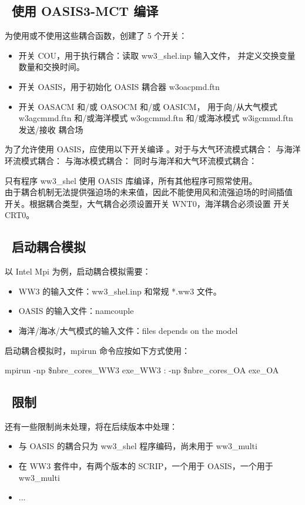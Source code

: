 \vssub
\subsection{~使用 OASIS3-MCT 编译} \label{sec:couplingB}
\vssub

为使用或不使用这些耦合函数，创建了 5 个开关：

\begin{itemize}
\item 开关 {\code COU}，用于执行耦合：读取 {\file ww3\_shel.inp} 输入文件，
      并定义交换变量数量和交换时间。
\item 开关 {\code OASIS}，用于初始化 OASIS 耦合器 {\file w3oacpmd.ftn}
\item 开关 {\code OASACM} 和/或 {\code OASOCM} 和/或 {\code OASICM}，
      用于向/从大气模式 {\file w3agcmmd.ftn} 和/或海洋模式
      {\file w3ogcmmd.ftn} 和/或海冰模式 {\file w3igcmmd.ftn} 发送/接收
      耦合场
\end{itemize}

为了允许使用 OASIS，应使用以下开关编译 \ws。对于与大气环流模式耦合：
与海洋环流模式耦合：
与海冰模式耦合：
同时与海洋和大气环流模式耦合：

只有程序 {\code ww3\_shel} 使用 OASIS 库编译，所有其他程序可照常使用。\\

由于耦合机制无法提供强迫场的未来值，因此不能使用风和流强迫场的时间插值
开关。根据耦合类型，大气耦合必须设置开关 {\code WNT0}，海洋耦合必须设置
开关 {\code CRT0}。

\vssub
\subsection{~启动耦合模拟} \label{sec:couplingC}
\vssub

以 Intel Mpi 为例，启动耦合模拟需要：

\begin{itemize}
\item WW3 的输入文件：{\file ww3\_shel.inp} 和常规 *.ww3 文件。
\item OASIS 的输入文件：{\file namcouple}
\item 海洋/海冰/大气模式的输入文件：{\file files depends on the model}
\end{itemize}

启动耦合模拟时，{\file mpirun} 命令应按如下方式使用：

{\code mpirun -np \$nbre\_cores\_WW3 exe\_WW3 : -np \$nbre\_cores\_OA exe\_OA}

\vssub
\subsection{~限制} \label{sec:couplingD}
\vssub

还有一些限制尚未处理，将在后续版本中处理：

\begin{itemize}
\item 与 OASIS 的耦合只为 ww3\_shel 程序编码，尚未用于 {\code ww3\_multi}
\item 在 WW3 套件中，有两个版本的 SCRIP，一个用于 OASIS，一个用于
      {\code ww3\_multi}
\item ...
\end{itemize}
